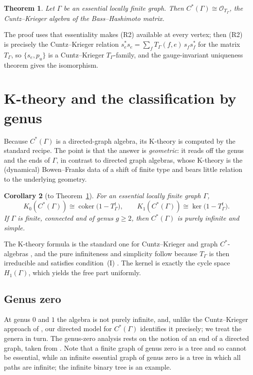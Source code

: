 \documentclass[12pt,reqno]{amsart}
\theoremstyle{plain}
\newtheorem{theorem}{Theorem}[section]
\newtheorem{corollary}[theorem]{Corollary}
\theoremstyle{definition}
\newcommand{\coker}{\operatorname{coker}}
\newcommand{\Ot}{\mathcal{O}}
\begin{document}
\begin{theorem}\label{thm:essential-CK}
Let $\Gamma$ be an essential locally finite graph. Then $C^*(\Gamma)\cong\Ot_{T_\Gamma}$, the
Cuntz--Krieger algebra of the Bass--Hashimoto matrix.
\end{theorem}

The proof uses that essentiality makes (R2) available at every vertex; then (R2) is precisely the
Cuntz--Krieger relation $s_e^{*}s_e=\sum_f T_\Gamma(f,e)\,s_fs_f^{*}$ for the matrix $T_\Gamma$, so
$\{s_e,p_u\}$ is a Cuntz--Krieger $T_\Gamma$-family, and the gauge-invariant uniqueness theorem gives
the isomorphism.


\section{K-theory and the classification by genus}\label{sec:ktheory}

Because $C^*(\Gamma)$ is a directed-graph algebra, its K-theory is computed by the standard
recipe. The point is that the answer is \emph{geometric}: it reads off the genus and the ends of
$\Gamma$, in contrast to directed graph algebras, whose K-theory is the (dynamical) Bowen--Franks
data of a shift of finite type and bears little relation to the underlying geometry.

\begin{corollary}[to Theorem~\ref{thm:essential-CK}]\label{cor:ker-coker}
For an essential locally finite graph $\Gamma$,
\[
K_0(C^*(\Gamma))\cong\coker\!\big(1-T_\Gamma^{t}\big),\qquad
K_1(C^*(\Gamma))\cong\ker\!\big(1-T_\Gamma^{t}\big).
\]
If $\Gamma$ is finite, connected and of genus $g\ge 2$, then $C^*(\Gamma)$ is purely infinite and
simple.
\end{corollary}

The K-theory formula is the standard one for Cuntz--Krieger and graph $C^*$-algebras \cite{PR,RS},
and the pure infiniteness and simplicity follow because $T_\Gamma$ is then irreducible and satisfies
condition~(I) \cite{CK}. The kernel is exactly the cycle space $H_1(\Gamma)$, which yields the free part
uniformly.


\subsection*{Genus zero} At genus $0$ and $1$ the algebra is not purely infinite, and, unlike the Cuntz--Krieger approach of \cite{CLM,Iyudu}, our
directed model for $C^*(\Gamma)$ identifies it precisely; we treat the genera in turn. The genus-zero analysis rests on the
notion of an end of a directed graph, taken from \cite[Definition~3.6]{PRennie}. Note that a finite
graph of genus zero is a tree and so cannot be essential, while an infinite essential graph of genus
zero is a tree in which all paths are infinite; the infinite binary tree is an example.
\end{document}
